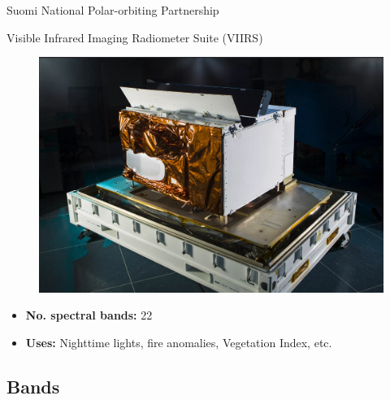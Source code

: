 \documentclass[aspectratio=169]{beamer} %
\begin{document}
\begin{frame}{Suomi National Polar-orbiting Partnership}
\begin{minipage}{0.6\textwidth}
\begin{itemize}
\begin{enumerate}
        \end{enumerate}
      \end{itemize}      
    \end{minipage} 
    
  \end{frame}
  
  \begin{frame}{Visible Infrared Imaging Radiometer Suite (VIIRS)}
    \noindent\begin{minipage}{0.273\textwidth}
          \begin{figure}
            \includegraphics[width=1.45\linewidth]{viirs.png}
          \end{figure}
        \end{minipage}%
        \hfill%
        \begin{minipage}{0.6\textwidth}\raggedleft
          \begin{itemize}
            \item \textbf{No. spectral bands:} 22
            \item \textbf{Uses:} Nighttime lights, fire anomalies, Vegetation Index, etc. 
          \end{itemize}      
        \end{minipage} 
      \end{frame}
      
      \subsection{Bands}
      
\end{document}
